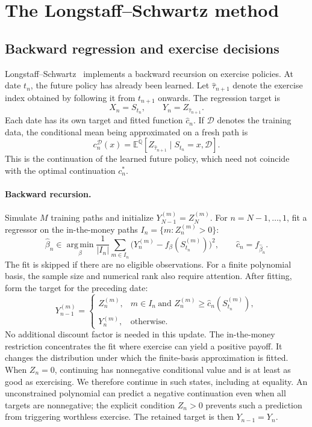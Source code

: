 \documentclass[11pt,a4paper]{article}
\newcommand{\E}{\mathbb E^{\mathbb Q}}
\newcommand{\argmin}{\operatorname*{arg\,min}}
\begin{document}
\section{The Longstaff--Schwartz method}
\subsection{Backward regression and exercise decisions}
Longstaff--Schwartz~\cite{LS} implements a backward recursion on exercise policies.
At date $t_n$, the future policy has already been learned. Let
$\widehat\tau_{n+1}$ denote the exercise index obtained by following it from
$t_{n+1}$ onwards. The regression target is
\begin{equation}\label{eq:target}
 X_n=S_{t_n},\qquad Y_n=Z_{\widehat\tau_{n+1}}.
\end{equation}
Each date has its own target and fitted function $\widehat c_n$.
If $\mathcal D$ denotes the training data, the conditional mean being approximated
on a fresh path is
\[
 c_n^{\mathcal D}(x)=\E[Z_{\widehat\tau_{n+1}}\mid S_{t_n}=x,\mathcal D].
\]
This is the continuation of the learned future policy, which need not coincide
with the optimal continuation $c_n^*$.

\paragraph{Backward recursion.}
Simulate $M$ training paths and initialize $Y_{N-1}^{(m)}=Z_N^{(m)}$.
For $n=N-1,\ldots,1$, fit a regressor on the in-the-money paths
$I_n=\{m:Z_n^{(m)}>0\}$:
\begin{equation}
 \widehat\beta_n\in\argmin_\beta\frac1{|I_n|}
 \sum_{m\in I_n}\bigl(Y_n^{(m)}-f_\beta(S_{t_n}^{(m)})\bigr)^2,
 \qquad \widehat c_n=f_{\widehat\beta_n}.
\end{equation}
The fit is skipped if there are no eligible observations. For a finite polynomial
basis, the sample size and numerical rank also require attention.
After fitting, form the target for the preceding date:
\begin{equation}\label{eq:update}
 Y_{n-1}^{(m)}=
 \begin{cases}
 Z_n^{(m)},&m\in I_n\ \text{and }Z_n^{(m)}\geq\widehat c_n(S_{t_n}^{(m)}),\\
 Y_n^{(m)},&\text{otherwise}.
 \end{cases}
\end{equation}
No additional discount factor is needed in this update. The in-the-money
restriction concentrates the fit where exercise can yield a positive payoff.
It changes the distribution under which the finite-basis approximation is fitted.
When $Z_n=0$, continuing has nonnegative conditional value and is at least as
good as exercising. We therefore continue in such states, including at equality.
An unconstrained polynomial can predict a negative continuation even when all
targets are nonnegative; the explicit condition $Z_n>0$ prevents such a prediction
from triggering worthless exercise. The retained target is then $Y_{n-1}=Y_n$.
\end{document}
